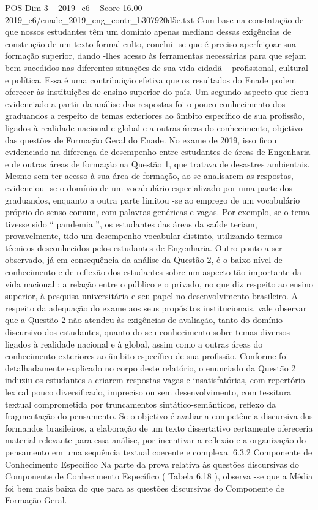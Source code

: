 \begin{textsample}{POS Dim 3 – 2019\_c6 – Score 16.00 – 2019\_c6/enade\_2019\_eng\_contr\_b307920d5e.txt}
Com base na constatação de que nossos estudantes têm um domínio apenas mediano dessas exigências de construção de um texto formal culto, conclui -se que é preciso aperfeiçoar sua formação superior, dando -lhes acesso às ferramentas necessárias para que sejam bem-sucedidos nas diferentes situações de sua vida cidadã – profissional, cultural e política.
Essa é uma contribuição efetiva que os resultados do Enade podem oferecer às instituições de ensino superior do país.
Um segundo aspecto que ficou evidenciado a partir da análise das respostas foi o pouco conhecimento dos graduandos a respeito de temas exteriores ao âmbito específico de sua profissão, ligados à realidade nacional e global e a outras áreas do conhecimento, objetivo das questões de Formação Geral do Enade.
No exame de 2019, isso ficou evidenciado na diferença de desempenho entre estudantes de áreas de Engenharia e de outras áreas de formação na Questão 1, que tratava de desastres ambientais.
Mesmo sem ter acesso à sua área de formação, ao se analisarem as respostas, evidenciou -se o domínio de um vocabulário especializado por uma parte dos graduandos, enquanto a outra parte limitou -se ao emprego de um vocabulário próprio do senso comum, com palavras genéricas e vagas.
Por exemplo, se o tema tivesse sido “ pandemia ”, os estudantes das áreas da saúde teriam, provavelmente, tido um desempenho vocabular distinto, utilizando termos técnicos desconhecidos pelos estudantes de Engenharia.
Outro ponto a ser observado, já em consequência da análise da Questão 2, é o baixo nível de conhecimento e de reflexão dos estudantes sobre um aspecto tão importante da vida nacional : a relação entre o público e o privado, no que diz respeito ao ensino superior, à pesquisa universitária e seu papel no desenvolvimento brasileiro.
A respeito da adequação do exame aos seus propósitos institucionais, vale observar que a Questão 2 não atendeu às exigências de avaliação, tanto do domínio discursivo dos estudantes, quanto do seu conhecimento sobre temas diversos ligados à realidade nacional e à global, assim como a outras áreas do conhecimento exteriores ao âmbito específico de sua profissão.
Conforme foi detalhadamente explicado no corpo deste relatório, o enunciado da Questão 2 induziu os estudantes a criarem respostas vagas e insatisfatórias, com repertório lexical pouco diversificado, impreciso ou sem desenvolvimento, com tessitura textual comprometida por truncamentos sintático-semânticos, reflexo da fragmentação do pensamento.
Se o objetivo é avaliar a competência discursiva dos formandos brasileiros, a elaboração de um texto dissertativo certamente ofereceria material relevante para essa análise, por incentivar a reflexão e a organização do pensamento em uma sequência textual coerente e complexa. 6.3.2 Componente de Conhecimento Específico Na parte da prova relativa às questões discursivas do Componente de Conhecimento Específico ( Tabela 6.18 ), observa -se que a Média foi bem mais baixa do que para as questões discursivas do Componente de Formação Geral.

\end{textsample}
